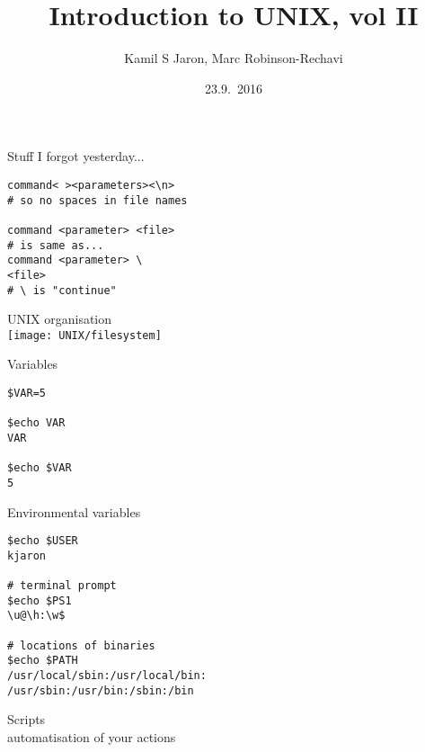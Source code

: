 \documentclass[xcolor=dvipsnames]{beamer}
\title[ ]{Introduction to UNIX, vol II}
\author{Kamil S Jaron, Marc Robinson-Rechavi}
\date{23.9.~2016}
\begin{document}
\begin{frame}
	\titlepage
\end{frame}

\begin{frame}[fragile]
	\begin{center}
		\huge
		Stuff I forgot yesterday...
	\end{center}
\LARGE
\begin{verbatim}
command< ><parameters><\n>
# so no spaces in file names

command <parameter> <file>
# is same as...
command <parameter> \
<file>
# \ is "continue"
\end{verbatim}
\end{frame}

\begin{frame}
	\begin{center}
		\Huge
		UNIX organisation \\
		\vspace{1cm}
		\texttt{[image: UNIX/filesystem]}
	\end{center}
\end{frame}

\begin{frame}[fragile]
	\begin{center}
		\Huge
		Variables
	\end{center}
\huge
\begin{verbatim}
$VAR=5

$echo VAR
VAR

$echo $VAR
5
\end{verbatim}
\end{frame}

\begin{frame}[fragile]
	\begin{center}
		\Huge
		Environmental variables
	\end{center}
\Large
\begin{verbatim}
$echo $USER
kjaron

# terminal prompt
$echo $PS1
\u@\h:\w$

# locations of binaries
$echo $PATH
/usr/local/sbin:/usr/local/bin:
/usr/sbin:/usr/bin:/sbin:/bin

\end{verbatim}
\end{frame}

\begin{frame}[fragile]
	\begin{center}
		\Huge
		Scripts \\
		\Large
		automatisation of your actions
	\end{center}
\end{frame}
\end{document}
